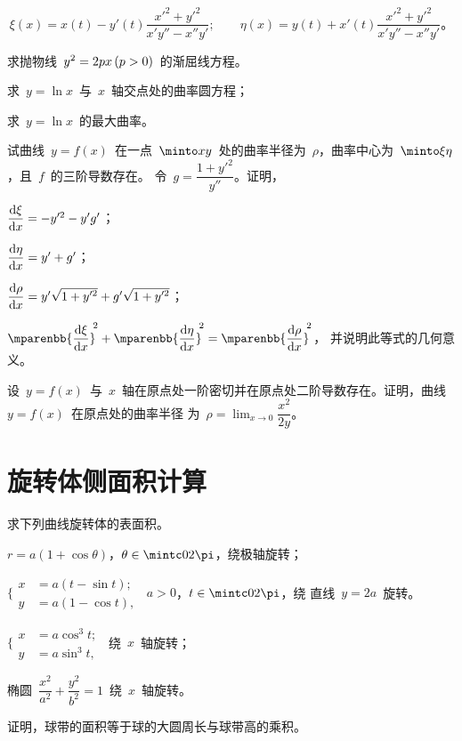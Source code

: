 \begin{exercise}
\[
  \xi(x)=x(t)-y'(t)\frac{x'^2+y'^2}{x'y''-x''y'};\qquad
  \eta(x)=y(t)+x'(t)\frac{x'^2+y'^2}{x'y''-x''y'}。
\]
\item 求抛物线~$y^2=2px\mcond{p>0}$~的渐屈线方程。
\item\begin{exlistcols}
  \item 求~$y=\ln x$~与~$x$~轴交点处的曲率圆方程；
  \item 求~$y=\ln x$~的最大曲率。
\end{exlistcols}
\item 试曲线~$y=f(x)$~在一点~$\minto xy$~处的曲率半径为~$\rho$，曲率中心为~$\minto\xi\eta$，且~$f$~的三阶导数存在。%
令~$g=\dfrac{1+y'^2}{y''}$。证明，
\begin{exlistcols}
  \item $\dfrac{\mathop{}\negthinspace\mathrm d\xi}{\mathop{}\negthinspace\mathrm d x}=-y'^2-y'g'$；
  \item $\dfrac{\mathop{}\negthinspace\mathrm d\eta}{\mathop{}\negthinspace\mathrm d x}=y'+g'$；
  \item $\dfrac{\dif\rho}{\dif x}=y'\smbsqrt{1+y'^2}+g'\smbsqrt{1+y'^2}$；
  \item $\mparenbb{\dfrac{\dif\xi}{\dif x}}^{\msp2}+\mparenbb{\dfrac{\dif\eta}{\dif x}}^{\msp2}
         =\mparenbb{\dfrac{\dif\rho}{\dif x}}^{\msp2}$，%
  并说明此等式的几何意义。
\end{exlistcols}
\item 设~$y=f(x)$~与~$x$~轴在原点处一阶密切并在原点处二阶导数存在。证明，曲线~$y=f(x)$~在原点处的曲率半径
为~$\rho=\lim_{x\to0}\dfrac{x^2}{2y}$。
\end{exercise}

\section{旋转体侧面积计算}
\begin{exercise}
\item 求下列曲线旋转体的表面积。
\begin{exlistcols}
  \item $r=a(1+\cos\theta)$，$\theta\in\mintc0{2\pi}$，绕极轴旋转；
  \item $\Biggl\lbrace\begin{aligned} x&=a(t-\sin t);\\ y&=a(1-\cos t),\end{aligned}$~$a>0$，$t\in\mintc0{2\pi}$，绕
  直线~$y=2a$~旋转。
  \item $\Biggl\lbrace\begin{aligned} x&=a\cos^3t;\\ y&=a\sin^3t,\end{aligned}$~绕~$x$~轴旋转；
  \item 椭圆~$\dfrac{x^2}{a^2}+\dfrac{y^2}{b^2}=1$~绕~$x$~轴旋转。
\end{exlistcols}
\item 证明，球带的面积等于球的大圆周长与球带高的乘积。
\end{exercise}

